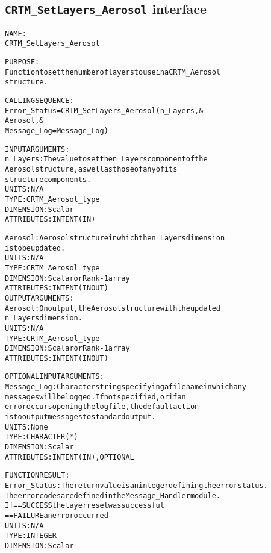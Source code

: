 \subsection{\texttt{CRTM\_SetLayers\_Aerosol} interface}
  \label{sec:CRTM_SetLayers_Aerosol_interface}
  \begin{alltt}
 
  NAME:
        CRTM_SetLayers_Aerosol
  
  PURPOSE:
        Function to set the number of layers to use in a CRTM_Aerosol
        structure.
 
  CALLING SEQUENCE:
        Error_Status = CRTM_SetLayers_Aerosol( n_Layers               , &
                                               Aerosol                , &
                                               Message_Log=Message_Log  )
 
  INPUT ARGUMENTS:
        n_Layers:     The value to set the n_Layers component of the 
                      Aerosol structure, as well as those of any of its
                      structure components.
                      UNITS:      N/A
                      TYPE:       CRTM_Aerosol_type
                      DIMENSION:  Scalar
                      ATTRIBUTES: INTENT(IN)
 
        Aerosol:      Aerosol structure in which the n_Layers dimension
                      is to be updated.
                      UNITS:      N/A
                      TYPE:       CRTM_Aerosol_type
                      DIMENSION:  Scalar or Rank-1 array
                      ATTRIBUTES: INTENT(IN OUT)
  OUTPUT ARGUMENTS:
        Aerosol:      On output, the Aerosol structure with the updated
                      n_Layers dimension.
                      UNITS:      N/A
                      TYPE:       CRTM_Aerosol_type
                      DIMENSION:  Scalar or Rank-1 array
                      ATTRIBUTES: INTENT(IN OUT)
 
  OPTIONAL INPUT ARGUMENTS:
        Message_Log:  Character string specifying a filename in which any
                      messages will be logged. If not specified, or if an
                      error occurs opening the log file, the default action
                      is to output messages to standard output.
                      UNITS:      None
                      TYPE:       CHARACTER(*)
                      DIMENSION:  Scalar
                      ATTRIBUTES: INTENT(IN), OPTIONAL
 
  FUNCTION RESULT:
        Error_Status: The return value is an integer defining the error status.
                      The error codes are defined in the Message_Handler module.
                      If == SUCCESS the layer reset was successful
                         == FAILURE an error occurred
                      UNITS:      N/A
                      TYPE:       INTEGER
                      DIMENSION:  Scalar
 

\end{alltt}

